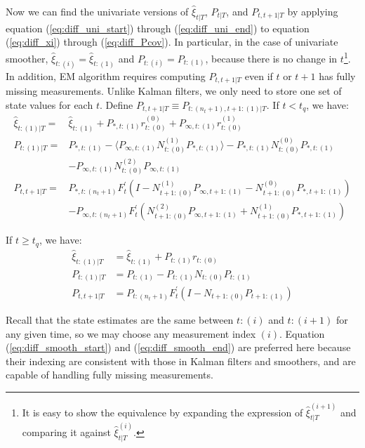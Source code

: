 \documentclass[10pt, titlepage]{article}
\numberwithin{equation}{section}
\begin{document}
Now we can find the univariate versions of $\hat{\xi}_{t|T}$, $P_{t|T}$, and $P_{t,t+1|T}$ by applying equation (\ref{eq:diff_uni_start}) through (\ref{eq:diff_uni_end}) to equation (\ref{eq:diff_xi}) through (\ref{eq:diff_Pcov}). In particular, in the case of univariate smoother, $\hat{\xi}_{t:(i)}=\hat{\xi}_{t:(1)}$ and $P_{t:(i)}=P_{t:(1)}$, because there is no change in $t$\footnote{It is easy to show the equivalence by expanding the expression of $\hat{\xi}_{t|T}^{(i+1)}$ and comparing it against $\hat{\xi}_{t|T}^{(i)}$.}. In addition, EM algorithm requires computing $P_{t,t+1|T}$ even if $t$ or $t+1$ has fully missing measurements. Unlike Kalman filters, we only need to store one set of state values for each $t$. Define $P_{t,t+1|T} \equiv P_{t:(n_t+1),t+1:(1)|T}$. If $t<t_q$, we have:
\begin{align}
    \hat{\xi}_{t:(1)|T} =& \hat{\xi}_{t:(1)} + P_{*,t:(1)}r_{t:(0)}^{(0)} + P_{\infty,t:(1)}r_{t:(0)}^{(1)} \label{eq:diff_smooth_start} \\
    P_{t:(1)|T} =& P_{*,t:(1)} - \langle P_{\infty,t:(1)}N_{t:(0)}^{(1)}P_{*,t:(1)} \rangle - P_{*,t:(1)}N_{t:(0)}^{(0)}P_{*,t:(1)} \nonumber \\
        &- P_{\infty,t:(1)}N_{t:(0)}^{(2)}P_{\infty,t:(1)} \\
    P_{t,t+1|T} =& P_{*,t:(n_t+1)}F_t^{'}(I-N_{t+1:(0)}^{(1)}P_{\infty,t+1:(1)} - N_{t+1:(0)}^{(0)}P_{*,t+1:(1)}) \nonumber \\
    &- P_{\infty,t:(n_t+1)}F_t^{'}(N_{t+1:(0)}^{(2)}P_{\infty,t+1:(1)}+N_{t+1:(0)}^{(1)}P_{*,t+1:(1)})
\end{align}

If $t \geq t_q$, we have:
\begin{align}
    \hat{\xi}_{t:(1)|T} &= \hat{\xi}_{t:(1)} + P_{t:(1)}r_{t:(0)} \\
    P_{t:(1)|T} &= P_{t:(1)} - P_{t:(1)}N_{t:(0)}P_{t:(1)} \\
    P_{t,t+1|T} &= P_{t:(n_t+1)}F_t^{'}(I - N_{t+1:(0)}P_{t+1:(1)}) \label{eq:diff_smooth_end}
\end{align}

Recall that the state estimates are the same between $t:(i)$ and $t:(i+1)$ for any given time, so we may choose any measurement index $(i)$. Equation (\ref{eq:diff_smooth_start}) and (\ref{eq:diff_smooth_end}) are preferred here because their indexing are consistent with those in Kalman filters and smoothers, and are capable of handling fully missing measurements.
\end{document}
